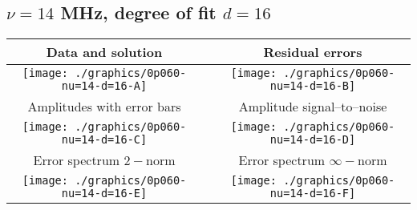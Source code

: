 

% 

\clearpage{}
\break{}

\subsection{$\nu = 14$ MHz, degree of fit $d = 16$}

\begin{table}[h]
    \begin{center}
        \begin{tabular}{ccc}
            Data and solution & \quad & Residual errors \\\hline
            \texttt{[image: ./graphics/0p060-nu=14-d=16-A]} &&
            \texttt{[image: ./graphics/0p060-nu=14-d=16-B]} \\[15pt]
            Amplitudes with error bars && Amplitude signal--to--noise \\\hline
            \texttt{[image: ./graphics/0p060-nu=14-d=16-C]} &&
            \texttt{[image: ./graphics/0p060-nu=14-d=16-D]} \\[15pt]
            Error spectrum $2-$norm && Error spectrum $\infty-$norm \\\hline
            \texttt{[image: ./graphics/0p060-nu=14-d=16-E]} &&
            \texttt{[image: ./graphics/0p060-nu=14-d=16-F]} \\[15pt]
        \end{tabular}
    \end{center}
\label{fig:elev=60, nu=14}
\end{table}



\endinput
